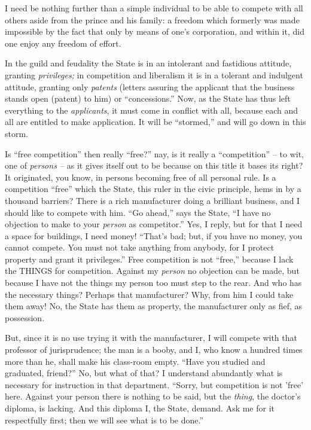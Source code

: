 \documentclass[12pt,a4paper]{book}
\begin{document}
I need be nothing further than a simple individual to be able to compete with 
all others aside from the prince and his family: a freedom which formerly was 
made impossible by the fact that only by means of one's corporation, and 
within it, did one enjoy any freedom of effort.

In the guild and feudality the State is in an intolerant and fastidious 
attitude, granting \textit{privileges;} in competition and liberalism it is in 
a tolerant and indulgent attitude, granting only \textit{patents} (letters 
assuring the applicant that the business stands open (patent) to him) or 
``concessions.'' Now, as the State has thus left everything to the 
\textit{applicants}, it must come in conflict with all, because each and all 
are entitled to make application. It will be ``stormed,'' and will go down 
in this storm.

Is ``free competition'' then really ``free?'' nay, is it really a 
``competition'' -- to wit, one of \textit{persons --} as it gives itself out 
to be because on this title it bases its right? It originated, you know, in 
persons becoming free of all personal rule. Is a competition ``free'' which 
the State, this ruler in the civic principle, hems in by a thousand barriers? 
There is a rich manufacturer doing a brilliant business, and I should like to 
compete with him. ``Go ahead,'' says the State, ``I have no objection to 
make to your \textit{person} as competitor.'' Yes, I reply, but for that I 
need a space for buildings, I need money! ``That's bad; but, if you have no 
money, you cannot compete. You must not take anything from anybody, for I 
protect property and grant it privileges.'' Free competition is not 
``free,'' because I lack the THINGS for competition. Against my 
\textit{person} no objection can be made, but because I have not the things my 
person too must step to the rear. And who has the necessary things? Perhaps 
that manufacturer? Why, from him I could take them away! No, the State has 
them as property, the manufacturer only as fief, as possession.

But, since it is no use trying it with the manufacturer, I will compete with 
that professor of jurisprudence; the man is a booby, and I, who know a hundred 
times more than he, shall make his class-room empty. ``Have you studied and 
graduated, friend?'' No, but what of that? I understand abundantly what is 
necessary for instruction in that department. ``Sorry, but competition is not 
'free' here. Against your person there is nothing to be said, but the 
\textit{thing}, the doctor's diploma, is lacking. And this diploma I, the 
State, demand. Ask me for it respectfully first; then we will see what is to 
be done.''
\end{document}
